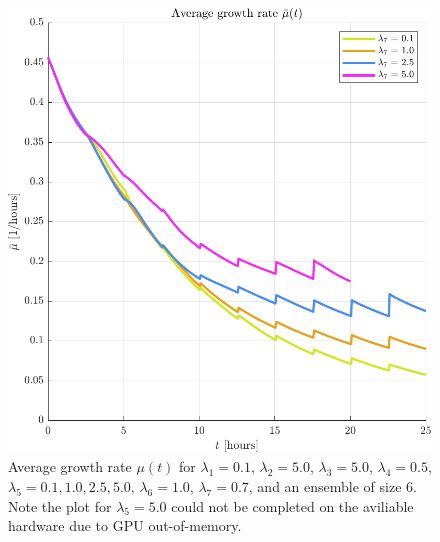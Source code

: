 \begin{figure}[!htb] %
    \centering
    \includegraphics[width= \textwidth]{
        chapter3/figures/Average_mu_EnsembleSize_6o0_L1_0o10_L2_5o00_L3_5o00_L4_0o50_L5_0o10_L6_1o00_L7_0o70.pdf}
    \caption{Average growth rate $\mu(t)$ for 
             $\lambda_1 = 0.1$,  
             $\lambda_2 = 5.0$, 
             $\lambda_3 = 5.0$, 
             $\lambda_4 = 0.5$, 
             $\lambda_5 = 0.1, 1.0, 2.5, 5.0$, 
             $\lambda_6 = 1.0$, 
             $\lambda_7 = 0.7$, and an ensemble of size $6$. Note the plot 
             for $\lambda_5 = 5.0$ could not be completed on the aviliable hardware
             due to GPU out-of-memory.}
    \label{fig: sdsd}
\end{figure}

